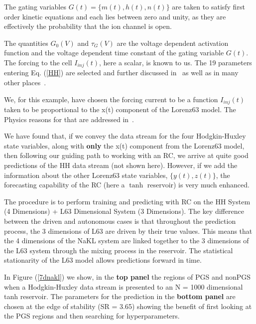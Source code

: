 \documentclass[12pt]{article}
\begin{document}
The gating variables $G(t) = \{m(t),h(t),n(t)\}$ are taken to satisfy first order kinetic equations and each lies between zero and unity, as they are effectively the probability that the ion channel is open. 

The quantities $G_0(V)$ and $\tau_G(V)$ are the voltage dependent activation function and the voltage dependent time constant of the gating variable $G(t)$. The forcing to the cell $I_{inj}(t)$, here a scalar, is known to us. The 19 parameters entering Eq. (\ref{HH}) are selected and further discussed in~\cite{toth2011dynamical} as well as in many other places~\cite{hodgkin1952quantitative,jwu,willshaw,abar2021}.

We, for this example, have chosen the forcing current to be a function $I_{inj}(t)$ taken to be proportional to the x(t) component of the Lorenz63 model. The Physics reasons for that are addressed in~\cite{toth2011dynamical}.


We have found that, if we convey the data stream for the four Hodgkin-Huxley state variables, along with {\bf only} the x(t) component from the Lorenz63 model, then following our guiding path to working with an RC, we arrive at quite good predictions of the HH data stream (not shown here). However, if we add the information about the other Lorenz63 state variables, $\{y(t),z(t)\}$, the forecasting capability of the RC (here a $\tanh$ reservoir) is very much enhanced.

The procedure is to perform training and predicting with RC on the HH System (4 Dimensions) + L63 Dimensional System (3 Dimensions). The key difference between the driven and autonomous cases is that throughout the prediction process, the 3 dimensions of L63 are driven by their true values.  This means that the 4 dimensions of the NaKL system are linked together to the 3 dimensions of the L63 system through the mixing process in the reservoir.  The statistical stationarity of the L63 model allows predictions forward in time.

In Figure (\ref{7dnakl}) we show, in the {\bf top panel} the regions of PGS and nonPGS when a Hodgkin-Huxley data stream is presented to an N = 1000 dimensional tanh reservoir.  The parameters for the prediction in the \textbf{bottom panel} are chosen at the edge of stability (SR = 3.65) showing the benefit of first looking at the PGS regions and then searching for hyperparameters.
\end{document}
